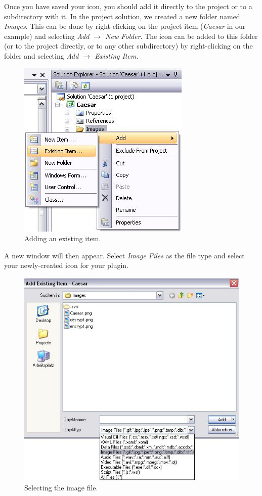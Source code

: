 Once you have saved your icon, you should add it directly to the project or to a subdirectory with it. In the project solution, we created a new folder named \textit{Images}. This can be done by right-clicking on the project item (\textit{Caesar} in our example) and selecting \textit{Add $\rightarrow$ New Folder}. The icon can be added to this folder (or to the project directly, or to any other subdirectory) by right-clicking on the folder and selecting \textit{Add $\rightarrow$ Existing Item}.

\begin{figure}[h!]
	\centering
		\includegraphics{figures/add_existing_item.jpg}
	\caption{Adding an existing item.}
	\label{fig:add_existing_item}
\end{figure}
\clearpage

A new window will then appear. Select \textit{Image Files} as the file type and select your newly-created icon for your plugin.

\begin{figure}[h!]
	\centering
		\includegraphics{figures/choose_icon.jpg}
	\caption{Selecting the image file.}
	\label{fig:choose_icon}
\end{figure}
\clearpage

